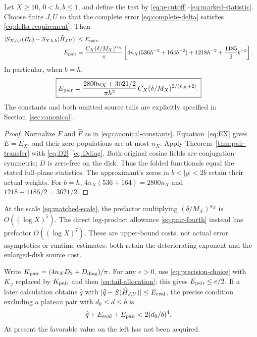 \begin{theorem}\label{thm:canonical-pair}
Let $X\ge10$, $0<h,b\le1$, and define the test by
\eqref{eq:p-cutoff}--\eqref{eq:marked-statistic}.
Choose finite $J,U$ so that the complete error
\eqref{eq:complete-delta} satisfies \eqref{eq:delta-requirement}.
Then
\begin{align}
 |S_{X,h,b}(H_0)-S_{X,h,b}(\widehat H_{J,U})|
 &\le E_{\rm pair},\label{eq:canonical-pair}\\
 E_{\rm pair}
 &=\frac{C_X(\delta/M_X)^{\alpha_X}}{\pi}
 \left[
 4n_X(536h^{-2}+164b^{-2})
 +1218h^{-2}+\frac{1185}{2}b^{-2}
 \right].\notag
\end{align}
In particular, when $b=h$,
\begin{equation}\label{eq:matched-error}
 \boxed{\displaystyle
 E_{\rm pair}=\frac{2800n_X+3621/2}{\pi h^2}\,
                  C_X(\delta/M_X)^{2/(n_X+2)} .}
\end{equation}
The constants and both omitted source tails are explicitly
specified in Section~\ref{sec:canonical}.
\end{theorem}
\begin{proof}
Normalize $F$ and $\widehat F$ as in \eqref{eq:canonical-constants}.
Equation~\eqref{eq:EX} gives $E=E_X$, and their zero populations are
at most $n_X$. Apply Theorem~\ref{thm:pair-transfer} with
\eqref{eq:D2}--\eqref{eq:Ddiag}. Both original cosine fields are
conjugation-symmetric; $D$ is zero-free on the disk. Thus the
folded functionals equal the stated full-plane statistics.
The approximant's zeros in $b<|y|<2b$ retain their actual weights.
For $b=h$, $4n_X(536+164)=2800n_X$ and
$1218+1185/2=3621/2$.
\end{proof}

At the scale \eqref{eq:matched-scale}, the prefactor multiplying
$(\delta/M_X)^{\alpha_X}$ is $O((\log X)^5)$.
The direct log-product allowance \eqref{eq:pair-fourth} instead
has prefactor $O((\log X)^7)$. These are upper-bound costs, not
actual error asymptotics or runtime estimates; both retain the
deteriorating exponent and the enlarged-disk source cost.

Write $K_{\rm pair}=(4n_XD_2+D_{\rm diag})/\pi$.
For any $e>0$, use \eqref{eq:precision-choice} with
$K_\varphi$ replaced by $K_{\rm pair}$ and then
\eqref{eq:tail-allocation}; this gives $E_{\rm pair}\le e/2$.
If a later calculation obtains $\widehat q$ with
$|\widehat q-S(\widehat H_{J,U})|\le E_{\rm eval}$, the precise
condition excluding a plateau pair with $d_0\le d\le b$ is
\begin{equation}\label{eq:pair-consumer}
 \widehat q+E_{\rm eval}+E_{\rm pair}<2(d_0/b)^4 .
\end{equation}
At present the favorable value on the left has not been acquired.

